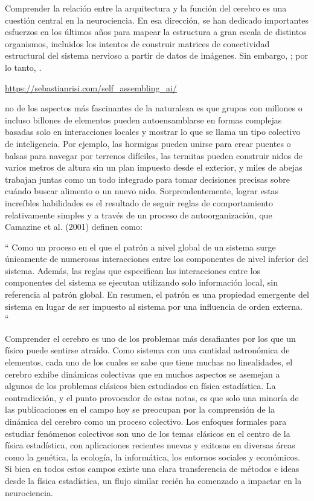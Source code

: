 Comprender la relación entre la arquitectura y la función del cerebro es una cuestión central en la neurociencia. En esa dirección, se han dedicado importantes esfuerzos en los últimos años para mapear la estructura a gran escala de distintos organismos, incluidos los intentos de construir matrices de conectividad estructural del sistema nervioso a partir de datos de imágenes.  Sin embargo,   ; por lo tanto,  \cite{sporns_discovering_2012}.


\url{https://sebastianrisi.com/self_assembling_ai/}

no de los aspectos más fascinantes de la naturaleza es que grupos con millones o incluso billones de elementos pueden autoensamblarse en formas complejas basadas solo en interacciones locales y mostrar lo que se llama un tipo colectivo de inteligencia. Por ejemplo, las hormigas pueden unirse para crear puentes o balsas para navegar por terrenos difíciles, las termitas pueden construir nidos de varios metros de altura sin un plan impuesto desde el exterior, y miles de abejas trabajan juntas como un todo integrado para tomar decisiones precisas sobre cuándo buscar alimento o un nuevo nido. Sorprendentemente, lograr estas increíbles habilidades es el resultado de seguir reglas de comportamiento relativamente simples y a través de un proceso de autoorganización, que Camazine et al. (2001) definen como:

“ Como un proceso en el que el patrón a nivel global de un sistema surge únicamente de numerosas interacciones entre los componentes de nivel inferior del sistema. Además, las reglas que especifican las interacciones entre los componentes del sistema se ejecutan utilizando solo información local, sin referencia al patrón global. En resumen, el patrón es una propiedad emergente del sistema en lugar de ser impuesto al sistema por una influencia de orden externa. “

Comprender el cerebro es uno de los problemas más desafiantes por los que un físico puede sentirse atraído. Como sistema con una cantidad astronómica de elementos, cada uno de los cuales se sabe que tiene muchas no linealidades, el cerebro exhibe dinámicas colectivas que en muchos aspectos se asemejan a algunos de los problemas clásicos bien estudiados en física estadística. La contradicción, y el punto provocador de estas notas, es que solo una minoría de las publicaciones en el campo hoy se preocupan por la comprensión de la dinámica del cerebro como un proceso colectivo. Los enfoques formales para estudiar fenómenos colectivos son uno de los temas clásicos en el centro de la física estadística, con aplicaciones recientes nuevas y exitosas en diversas áreas como la genética, la ecología, la informática, los entornos sociales y económicos. Si bien en todos estos campos existe una clara transferencia de métodos e ideas desde la física estadística, un flujo similar recién ha comenzado a impactar en la neurociencia.

